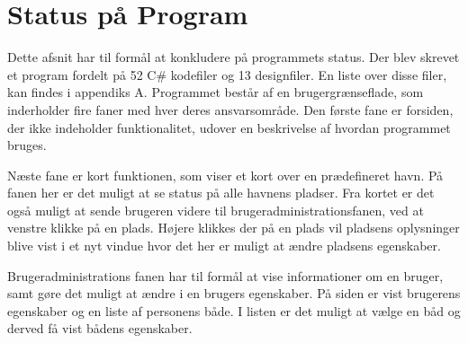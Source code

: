 \section{Status på Program} 
\label{sec:status_p_program}

Dette afsnit har til formål at konkludere på programmets status. Der blev skrevet et program fordelt på 52 C\# kodefiler og 13 designfiler. En liste over disse filer, kan findes i appendiks A. Programmet består af en brugergrænseflade, som inderholder fire faner med hver deres ansvarsområde. Den første fane er forsiden, der ikke indeholder funktionalitet, udover en beskrivelse af hvordan programmet bruges.

Næste fane er kort funktionen, som viser et kort over en prædefineret havn. På fanen her er det muligt at se status på alle havnens pladser. Fra kortet er det også muligt at sende brugeren videre til brugeradministrationsfanen, ved at venstre klikke på en plads. Højere klikkes der på en plads vil pladsens oplysninger blive vist i et nyt vindue hvor det her er muligt at ændre pladsens egenskaber.

Brugeradministrations fanen har til formål at vise informationer om en bruger, samt gøre det muligt at ændre i en brugers egenskaber. På siden er vist brugerens egenskaber og en liste af personens både. I listen er det muligt at vælge en båd og derved få vist bådens egenskaber.


